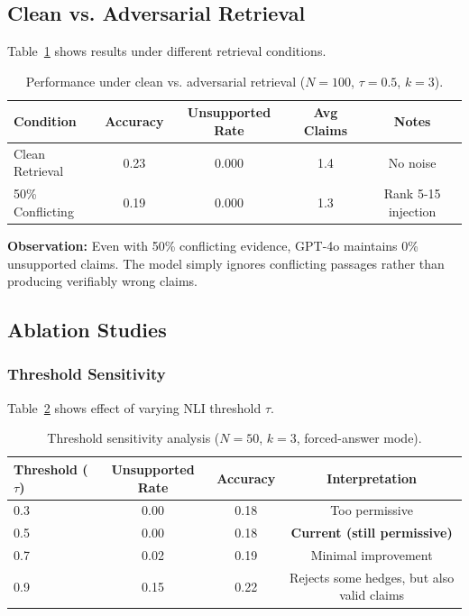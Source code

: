 \documentclass[11pt]{article}
\begin{document}
\subsection{Clean vs. Adversarial Retrieval}

Table~\ref{tab:retrieval_conditions} shows results under different retrieval conditions.

\begin{table}[h]
\centering
\caption{Performance under clean vs. adversarial retrieval ($N=100$, $\tau=0.5$, $k=3$).}
\label{tab:retrieval_conditions}
\begin{tabular}{lcccc}
\toprule
\textbf{Condition} & \textbf{Accuracy} & \textbf{Unsupported Rate} & \textbf{Avg Claims} & \textbf{Notes} \\
\midrule
Clean Retrieval & 0.23 & 0.000 & 1.4 & No noise \\
50\% Conflicting & 0.19 & 0.000 & 1.3 & Rank 5-15 injection \\
\bottomrule
\end{tabular}
\end{table}

\textbf{Observation:} Even with 50\% conflicting evidence, GPT-4o maintains 0\% unsupported claims. The model simply ignores conflicting passages rather than producing verifiably wrong claims.

\subsection{Ablation Studies}

\subsubsection{Threshold Sensitivity}

Table~\ref{tab:threshold_ablation} shows effect of varying NLI threshold $\tau$.

\begin{table}[h]
\centering
\caption{Threshold sensitivity analysis ($N=50$, $k=3$, forced-answer mode).}
\label{tab:threshold_ablation}
\begin{tabular}{lccc}
\toprule
\textbf{Threshold ($\tau$)} & \textbf{Unsupported Rate} & \textbf{Accuracy} & \textbf{Interpretation} \\
\midrule
0.3 & 0.00 & 0.18 & Too permissive \\
0.5 & 0.00 & 0.18 & \textbf{Current (still permissive)} \\
0.7 & 0.02 & 0.19 & Minimal improvement \\
0.9 & 0.15 & 0.22 & Rejects some hedges, but also valid claims \\
\bottomrule
\end{tabular}
\end{table}
\end{document}
